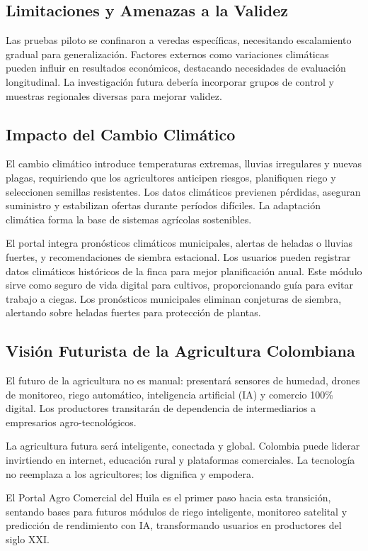 \subsection{Limitaciones y Amenazas a la Validez}

Las pruebas piloto se confinaron a veredas específicas, necesitando escalamiento gradual para generalización. Factores externos como variaciones climáticas pueden influir en resultados económicos, destacando necesidades de evaluación longitudinal. La investigación futura debería incorporar grupos de control y muestras regionales diversas para mejorar validez.
\subsection{Impacto del Cambio Climático}

El cambio climático introduce temperaturas extremas, lluvias irregulares y nuevas plagas, requiriendo que los agricultores anticipen riesgos, planifiquen riego y seleccionen semillas resistentes. Los datos climáticos previenen pérdidas, aseguran suministro y estabilizan ofertas durante períodos difíciles. La adaptación climática forma la base de sistemas agrícolas sostenibles.

El portal integra pronósticos climáticos municipales, alertas de heladas o lluvias fuertes, y recomendaciones de siembra estacional. Los usuarios pueden registrar datos climáticos históricos de la finca para mejor planificación anual. Este módulo sirve como seguro de vida digital para cultivos, proporcionando guía para evitar trabajo a ciegas. Los pronósticos municipales eliminan conjeturas de siembra, alertando sobre heladas fuertes para protección de plantas.
\subsection{Visión Futurista de la Agricultura Colombiana}

El futuro de la agricultura no es manual: presentará sensores de humedad, drones de monitoreo, riego automático, inteligencia artificial (IA) y comercio 100\% digital. Los productores transitarán de dependencia de intermediarios a empresarios agro-tecnológicos.

La agricultura futura será inteligente, conectada y global. Colombia puede liderar invirtiendo en internet, educación rural y plataformas comerciales. La tecnología no reemplaza a los agricultores; los dignifica y empodera.

El Portal Agro Comercial del Huila es el primer paso hacia esta transición, sentando bases para futuros módulos de riego inteligente, monitoreo satelital y predicción de rendimiento con IA, transformando usuarios en productores del siglo XXI.
